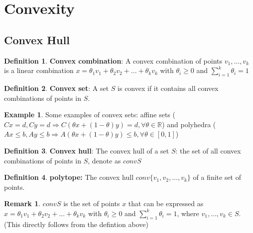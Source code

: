 \documentclass[10pt]{article}
\def\R{\mathbb{R}}
\def\imp{\Rightarrow}
\theoremstyle{definition}
\newtheorem{defn}{Definition}[section]
\newtheorem{example}{Example}[section]
\newtheorem{remark}{Remark}[section]
\begin{document}
\section{Convexity}

\subsection{Convex Hull}

\begin{defn}\textbf{Convex combination}:
	A convex combination of points $v_1, \dots , v_k$ is a linear combination
	$x = \theta_1v_1 + \theta_2v_2 + ... + \theta_kv_k$ with $\theta_i \ge 0$ and $\sum_{i=1}^{k}\theta_i = 1$
\end{defn}

\begin{defn}\textbf{Convex set}:
	A set $S$ is convex if it contains all convex combinations of points in $S$.
\end{defn}

\begin{example}
	Some examples of convex sets: affine sets ($Cx = d, Cy = d \imp C(\theta x + (1-\theta)y) = d,\forall \theta \in \R$)
	and polyhedra ($Ax \le b, Ay \le b \imp A(\theta x + (1-\theta)y) \le b, \forall \theta \in [0,1]$)
\end{example}

\begin{defn}
	\textbf{Convex hull}: The convex hull of a set $S$: the set of all convex combinations of points in $S$, denote as $convS$
\end{defn}

\begin{defn}
	\textbf{polytope:} The convex hull $conv\{v_1, v_2, \dots, v_k\}$ of a finite set of points.
\end{defn}

\begin{remark}
	$convS$ is the set of points $x$ that can be expressed as
	$x = \theta_1v_1 + \theta_2v_2 + ... + \theta_kv_k$ with $\theta_i \ge 0$ and
	$\sum_{i=1}^{k}\theta_i = 1$, where $v_1, \dots , v_k \in S$.
	(This directly follows from the defintion above)
\end{remark}
\end{document}
